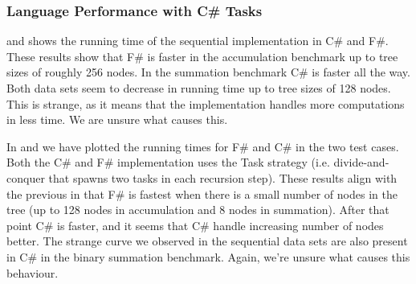 \subsubsection{Language Performance with C\# Tasks}
 and  shows the running time of the sequential implementation in C\# and F\#. These results show that F\# is faster in the accumulation benchmark up to tree sizes of roughly 256 nodes. In the summation benchmark C\# is faster all the way. Both data sets seem to decrease in running time up to tree sizes of 128 nodes. This is strange, as it means that the implementation handles more computations in less time. We are unsure what causes this.

In  and  we have plotted the running times for F\# and C\# in the two test cases. Both the C\# and F\# implementation uses the Task strategy (i.e. divide-and-conquer that spawns two tasks in each recursion step). These results align with the previous in that F\# is fastest when there is a small number of nodes in the tree (up to 128 nodes in accumulation and 8 nodes in summation). After that point C\# is faster, and it seems that C\# handle increasing number of nodes better. The strange curve we observed in the sequential data sets are also present in C\# in the binary summation benchmark. Again, we're unsure what causes this behaviour.


